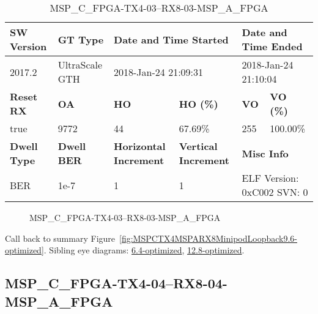 \begin{table}[h]
\centering
\caption{MSP\_C\_FPGA-TX4-03--RX8-03-MSP\_A\_FPGA}
\label{tab:MSPCFPGATX403RX803MSPAFPGA9.6-optimized}
\begin{tabular}{@{}|l|l|l|l|l|l|@{}}
\toprule
\textbf{SW Version}                & \textbf{GT Type}   & \multicolumn{2}{l|}{\textbf{Date and Time Started}}            & \multicolumn{2}{l|}{\textbf{Date and Time Ended}}        \\ \midrule
2017.2                       & UltraScale GTH          & \multicolumn{2}{l|}{2018-Jan-24 21:09:31}                   & \multicolumn{2}{l|}{2018-Jan-24 21:10:04}               \\ \midrule
\textbf{Reset RX}                  & \textbf{OA} & \textbf{HO}   & \textbf{HO (\%)} & \textbf{VO} & \textbf{VO (\%)} \\ \midrule
true & 9772        & 44          & 67.69\%        & 255        & 100.00\%       \\ \midrule
\textbf{Dwell Type}                & \textbf{Dwell BER} & \textbf{Horizontal Increment} & \textbf{Vertical Increment}    & \multicolumn{2}{l|}{\textbf{Misc Info}}                  \\ \midrule
BER                            & 1e-7        & 1        & 1           & \multicolumn{2}{l|}{ELF Version: 0xC002 SVN: 0}                         \\ \bottomrule
\end{tabular}
\end{table}

\begin{figure}[h]
\caption{MSP\_C\_FPGA-TX4-03--RX8-03-MSP\_A\_FPGA} \label{fig:MSPCFPGATX403RX803MSPAFPGA9.6-optimized}
\end{figure}

Call back to summary Figure~\ref{fig:MSPCTX4MSPARX8MinipodLoopback9.6-optimized}.
Sibling eye diagrams: \hyperref[sec:MSPCFPGATX403RX803MSPAFPGA6.4-optimized]{6.4-optimized}, \hyperref[sec:MSPCFPGATX403RX803MSPAFPGA12.8-optimized]{12.8-optimized}.

\clearpage
\newpage


\subsection{MSP\_C\_FPGA-TX4-04--RX8-04-MSP\_A\_FPGA}\label{sec:MSPCFPGATX404RX804MSPAFPGA9.6-optimized}

